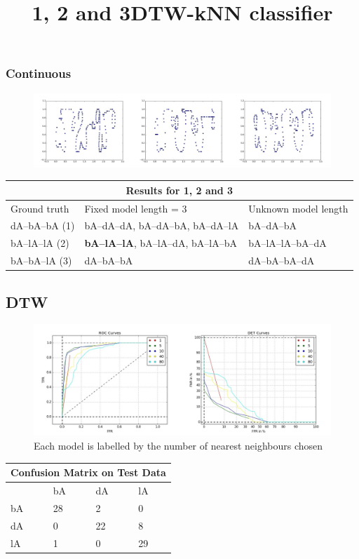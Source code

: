 \documentclass{article}
\begin{document}
\subsubsection{Continuous}
\begin{figure}[h!]
\centering
\title{1, 2 and 3}
\includegraphics[width=\textwidth]{handwriting/plots/viz/123.jpg}
\end{figure}
\begin{table}[h!]
\centering
\begin{tabular}{ |p{2.5cm}|p{2.5cm}|p{3.5cm}|  }
\hline
\multicolumn{3}{|c|}{Results for 1, 2 and 3} \\
\hline
Ground truth & Fixed model length = 3 & Unknown model length \\
\hline
dA--bA--bA (1) & bA--dA--dA, bA--dA--bA, bA--dA--lA  & bA--dA--bA\\
bA--lA--lA (2) & \textbf{bA--lA--lA}, bA--lA--dA, bA--lA--bA & bA--lA--lA--bA--dA\\
bA--bA--lA (3) & dA--bA--bA & dA--bA--bA--dA\\
\hline
\end{tabular}
\end{table}


\subsection{DTW}
\begin{figure}[h!]
\centering
\title{DTW-kNN classifier}
\includegraphics[width=\textwidth]{handwriting/plots/dtw/roc_det_x,y,kt.jpg}
\caption{Each model is labelled by the number of nearest neighbours chosen}
\end{figure}

\begin{table}[h!]
\centering
\begin{tabular}{ |p{1.5cm}|p{1.5cm}|p{1.5cm}|p{1.5cm}|  }
\hline
\multicolumn{4}{|c|}{Confusion Matrix on Test Data} \\
\hline
 & bA & dA & lA \\
\hline
bA & 28 & 2 & 0\\
dA & 0 & 22 & 8\\
lA & 1 & 0 & 29\\
\hline
\end{tabular}
\end{table}
\end{document}
